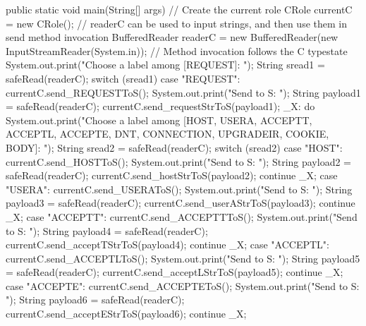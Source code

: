 \begin{code}
{    public static void main(String[] args) {
        // Create the current role
        CRole currentC = new CRole();
        // readerC can be used to input strings, and then use them in send method invocation
        BufferedReader readerC = new BufferedReader(new InputStreamReader(System.in));
        // Method invocation follows the C typestate
        System.out.print("Choose a label among [REQUEST]: ");
        String sread1 = safeRead(readerC);
        switch (sread1) {
            case "REQUEST":
                currentC.send_REQUESTToS();
                System.out.print("Send to S: ");
                String payload1 = safeRead(readerC);
                currentC.send_requestStrToS(payload1);
                _X:
                do {
                    System.out.print("Choose a label among [HOST, USERA, ACCEPTT, ACCEPTL, ACCEPTE, DNT, CONNECTION, UPGRADEIR, COOKIE, BODY]: ");
                    String sread2 = safeRead(readerC);
                    switch (sread2) {
                        case "HOST":
                            currentC.send_HOSTToS();
                            System.out.print("Send to S: ");
                            String payload2 = safeRead(readerC);
                            currentC.send_hostStrToS(payload2);
                            continue _X;
                        case "USERA":
                            currentC.send_USERAToS();
                            System.out.print("Send to S: ");
                            String payload3 = safeRead(readerC);
                            currentC.send_userAStrToS(payload3);
                            continue _X;
                        case "ACCEPTT":
                            currentC.send_ACCEPTTToS();
                            System.out.print("Send to S: ");
                            String payload4 = safeRead(readerC);
                            currentC.send_acceptTStrToS(payload4);
                            continue _X;
                        case "ACCEPTL":
                            currentC.send_ACCEPTLToS();
                            System.out.print("Send to S: ");
                            String payload5 = safeRead(readerC);
                            currentC.send_acceptLStrToS(payload5);
                            continue _X;
                        case "ACCEPTE":
                            currentC.send_ACCEPTEToS();
                            System.out.print("Send to S: ");
                            String payload6 = safeRead(readerC);
                            currentC.send_acceptEStrToS(payload6);
                            continue _X;
}}}}}
\end{code}
